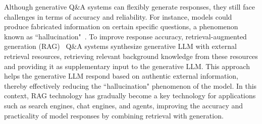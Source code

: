 Although generative Q\&A systems can flexibly generate responses, they still face challenges in terms of accuracy and reliability. For instance, models could produce fabricated information on certain specific questions, a phenomenon known as ``hallucination"~\cite{huang2023survey}. To improve response accuracy, retrieval-augmented generation (RAG)~\cite{lewis2020retrieval} Q\&A systems synthesize generative LLM with external retrieval resources, retrieving relevant background knowledge from these resources and providing it as supplementary input to the generative LLM. This approach helps the generative LLM respond based on authentic external information, thereby effectively reducing the ``hallucination" phenomenon of the model. In this context, RAG technology has gradually become a key technology for applications
such as search engines, chat engines, and agents, improving
the accuracy and practicality of model responses by combining
retrieval with generation. 

